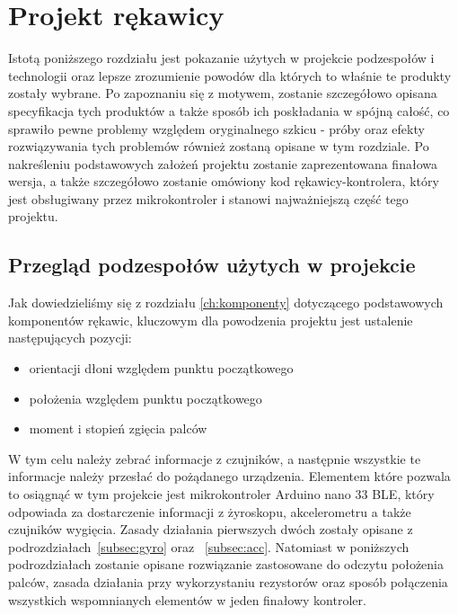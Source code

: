 \chapter{Projekt rękawicy}
\label{ch:rekawica}
Istotą poniższego rozdziału jest pokazanie użytych w projekcie podzespołów i technologii oraz lepsze zrozumienie powodów dla których to właśnie te produkty zostały wybrane. Po zapoznaniu się z motywem, zostanie szczegółowo opisana specyfikacja tych produktów a także sposób ich poskładania w spójną całość, co sprawiło pewne problemy względem oryginalnego szkicu - próby oraz efekty rozwiązywania tych problemów również zostaną opisane w tym rozdziale. Po nakreśleniu podstawowych założeń projektu zostanie zaprezentowana finałowa wersja, a także szczegółowo zostanie omówiony kod rękawicy-kontrolera, który jest obsługiwany przez mikrokontroler i stanowi najważniejszą część tego projektu.

\section{Przegląd podzespołów użytych w projekcie}
\label{sec:przeglad}
Jak dowiedzieliśmy się z rozdziału \ref{ch:komponenty} dotyczącego podstawowych komponentów rękawic, kluczowym dla powodzenia projektu jest ustalenie następujących pozycji: 
\begin{itemize}
\item orientacji dłoni względem punktu początkowego
\item położenia względem punktu początkowego
\item moment i stopień zgięcia palców 
\end{itemize}
 W tym celu należy zebrać informacje z czujników, a następnie wszystkie te informacje należy przesłać do pożądanego urządzenia. Elementem które pozwala to osiągnąć w tym projekcie jest mikrokontroler Arduino nano 33 BLE, który odpowiada za dostarczenie informacji z żyroskopu, akcelerometru a także czujników wygięcia. Zasady działania pierwszych dwóch zostały opisane z podrozdziałach~\ref{subsec:gyro} oraz ~\ref{subsec:acc}. Natomiast w poniższych podrozdziałach zostanie opisane rozwiązanie zastosowane do odczytu położenia palców, zasada działania przy wykorzystaniu rezystorów oraz sposób połączenia wszystkich wspomnianych elementów w jeden finałowy kontroler.
	
